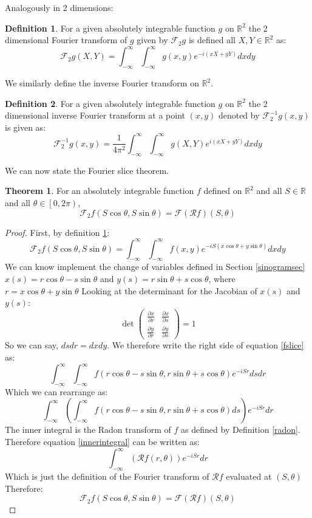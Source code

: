 \documentclass{article}
\theoremstyle{definition}
\newtheorem{definition}{Definition}[section]
\newtheorem{theorem}{Theorem}
\begin{document}
Analogously in 2 dimensions:
\begin{definition}
For a given absolutely integrable function $g$ on $\mathbb{R} ^ 2$ the 2 dimensional Fourier transform of $g$ given by $\mathcal{F}_2 g$ is defined all $X, Y \in \mathbb{R} ^ 2$ as:
$$
\mathcal{F}_2 g(X, Y) =  \int_{-\infty}^{\infty} \int_{-\infty}^{\infty} g(x, y) e^{- i (x X + yY)}dxdy
$$
\label{2dfourier}
\end{definition}

We similarly define the inverse Fourier transform on $\mathbb{R}^2$.

\begin{definition}
For a given absolutely integrable function $g$ on $\mathbb{R} ^ 2$ the 2 dimensional inverse Fourier transform at a point $(x,y)$ denoted by $\mathcal{F}_2 ^{-1} g(x,y)$ is given as:
$$
\mathcal{F}_2 ^{-1} g(x, y) = \frac{1}{4 \pi^2} \int_{-\infty}^{\infty} \int_{-\infty}^{\infty} g(X, Y) e^{i (x X + yY)}dxdy
$$
\end{definition}

We can now state the Fourier slice theorem.
\begin{theorem}
For an absolutely integrable function $f$ defined on $\mathbb{R}^2$ and all $S \in \mathbb{R}$ and all $\theta \in \left[ 0, 2\pi \right)$,
$$
\mathcal{F}_2 f(S \cos \theta, S \sin \theta) = \mathcal{F}(\mathcal{R}f)(S, \theta)
$$
\label{cslice}
\end{theorem}
\begin{proof} 
First, by definition \ref{2dfourier}:
$$
\mathcal{F}_2 f(S \cos \theta, S \sin \theta) =  \int_{-\infty}^{\infty} \int_{-\infty}^{\infty} f(x, y) e^{- i S(x \cos \theta + y \sin \theta )}dxdy
$$ \label{fslice}
We can know  implement the change of variables defined in Section \ref{sinogramsec} \\
$x(s) = r \cos \theta - s \sin \theta$ and $y(s) = r \sin \theta + s \cos \theta$, where $r = x \cos \theta + y \sin \theta$
Looking at the determinant for the Jacobian of $x(s)$ and $y(s)$:
$$
\det \begin{pmatrix}
       \frac{\partial x}{\partial r} & \frac{\partial x}{\partial s} \\
       \frac{\partial y}{\partial r} & \frac{\partial y}{\partial s}
   \end{pmatrix} = 1
$$
So we can say, $dsdr = dxdy$. We therefore write the right side of equation \ref{fslice} as:
$$
\int_{-\infty}^{\infty} \int_{-\infty}^{\infty} f(r \cos \theta - s \sin \theta, r \sin \theta + s \cos \theta) e^{- i S r}dsdr
$$
Which we can rearrange as:
$$
\int_{-\infty}^{\infty} \left( \int_{-\infty}^{\infty} f(r \cos \theta - s \sin \theta, r \sin \theta + s \cos \theta)ds  \right) e^{- i S r}dr
\label{innerintegral}
$$
The inner integral is the Radon transform of $f$ as defined by Definition \ref{radon}. Therefore equation \ref{innerintegral} can be written as:
$$
\int_{-\infty}^{\infty} \left( \mathcal{R} f (r, \theta) \right) e^{- i S r}dr
$$
Which is just the definition of the Fourier transform of $\mathcal{R} f$ evaluated at $(S, \theta)$\\
Therefore:
$$
\mathcal{F}_2 f(S \cos \theta, S \sin \theta) = \mathcal{F}(\mathcal{R}f)(S, \theta)
$$
\end{proof}
\end{document}
